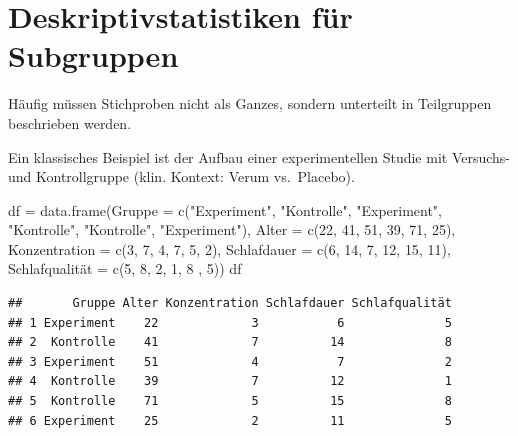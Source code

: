 \documentclass[
]{book}
\newenvironment{Shaded}{\begin{snugshade}}{\end{snugshade}}
\newcommand{\AttributeTok}[1]{\textcolor[rgb]{0.77,0.63,0.00}{#1}}
\newcommand{\DecValTok}[1]{\textcolor[rgb]{0.00,0.00,0.81}{#1}}
\newcommand{\FunctionTok}[1]{\textcolor[rgb]{0.00,0.00,0.00}{#1}}
\newcommand{\NormalTok}[1]{#1}
\newcommand{\OtherTok}[1]{\textcolor[rgb]{0.56,0.35,0.01}{#1}}
\newcommand{\StringTok}[1]{\textcolor[rgb]{0.31,0.60,0.02}{#1}}
\begin{document}
\hypertarget{deskriptivstatistiken-fuxfcr-subgruppen}{%
\section{Deskriptivstatistiken für Subgruppen}\label{deskriptivstatistiken-fuxfcr-subgruppen}}

Häufig müssen Stichproben nicht als Ganzes, sondern unterteilt in Teilgruppen beschrieben werden.

Ein klassisches Beispiel ist der Aufbau einer experimentellen Studie mit Versuchs- und Kontrollgruppe (klin. Kontext: Verum vs.~Placebo).

\begin{Shaded}
\begin{Highlighting}[]
\NormalTok{df }\OtherTok{=} \FunctionTok{data.frame}\NormalTok{(}\AttributeTok{Gruppe =} \FunctionTok{c}\NormalTok{(}\StringTok{"Experiment"}\NormalTok{, }\StringTok{"Kontrolle"}\NormalTok{, }\StringTok{"Experiment"}\NormalTok{, }\StringTok{"Kontrolle"}\NormalTok{, }\StringTok{"Kontrolle"}\NormalTok{, }\StringTok{"Experiment"}\NormalTok{),}
                \AttributeTok{Alter =} \FunctionTok{c}\NormalTok{(}\DecValTok{22}\NormalTok{, }\DecValTok{41}\NormalTok{, }\DecValTok{51}\NormalTok{, }\DecValTok{39}\NormalTok{, }\DecValTok{71}\NormalTok{, }\DecValTok{25}\NormalTok{),}
                \AttributeTok{Konzentration =} \FunctionTok{c}\NormalTok{(}\DecValTok{3}\NormalTok{, }\DecValTok{7}\NormalTok{, }\DecValTok{4}\NormalTok{, }\DecValTok{7}\NormalTok{, }\DecValTok{5}\NormalTok{, }\DecValTok{2}\NormalTok{),}
                \AttributeTok{Schlafdauer =} \FunctionTok{c}\NormalTok{(}\DecValTok{6}\NormalTok{, }\DecValTok{14}\NormalTok{, }\DecValTok{7}\NormalTok{, }\DecValTok{12}\NormalTok{, }\DecValTok{15}\NormalTok{, }\DecValTok{11}\NormalTok{),}
\NormalTok{                Schlafqualität }\OtherTok{=} \FunctionTok{c}\NormalTok{(}\DecValTok{5}\NormalTok{, }\DecValTok{8}\NormalTok{, }\DecValTok{2}\NormalTok{, }\DecValTok{1}\NormalTok{, }\DecValTok{8}\NormalTok{ , }\DecValTok{5}\NormalTok{))}
\NormalTok{df}
\end{Highlighting}
\end{Shaded}

\begin{verbatim}
##       Gruppe Alter Konzentration Schlafdauer Schlafqualität
## 1 Experiment    22             3           6              5
## 2  Kontrolle    41             7          14              8
## 3 Experiment    51             4           7              2
## 4  Kontrolle    39             7          12              1
## 5  Kontrolle    71             5          15              8
## 6 Experiment    25             2          11              5
\end{verbatim}
\end{document}
